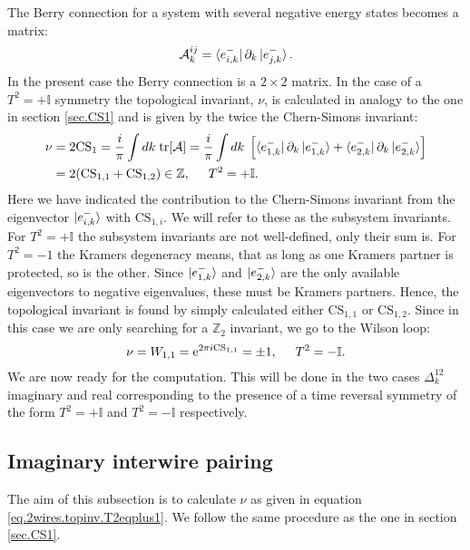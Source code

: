 The Berry connection for a system with several negative energy states becomes a matrix:
\begin{equation}
\mathcal{A}^{ij}_k = \bra{e^{-}_{i,k}}\partial_k\ket{e^{-}_{j,k}}.
\end{equation}
In the present case the Berry connection is a $2\times 2$ matrix. In the case of a $T^2 = + \mathbb{I}$ symmetry the topological invariant, $\nu$, is calculated in analogy to the one in section \ref{sec.CS1} and is given by the twice the Chern-Simons invariant:
\begin{align}
\nu &= 2\text{CS}_1 = \frac{i}{\pi} \int dk\; \text{tr}[\mathcal{A}] = \frac{i}{\pi} \int dk\; \left[\bra{e^{-}_{1,k}}\partial_k\ket{e^{-}_{1,k}} + \bra{e^{-}_{2,k}}\partial_k\ket{e^{-}_{2,k}}  \right] \nonumber \\
 &= 2(\text{CS}_{1,1} + \text{CS}_{1,2})\in \mathbb{Z}, \hspace{0.5cm} T^2 = +\mathbb{I}.
\label{eq.2wires.topinv.T2eqplus1}
\end{align}
Here we have indicated the contribution to the Chern-Simons invariant from the eigenvector $\ket{e^{-}_{i,k}}$ with $\text{CS}_{1,i}$. We will refer to these as the subsystem invariants. For $T^2 = +\mathbb{I}$ the subsystem invariants are not well-defined, only their sum is. For $T^2 = -1$ the Kramers degeneracy means, that as long as one Kramers partner is protected, so is the other. Since $\ket{e^{-}_{1,k}}$ and $\ket{e^{-}_{2,k}}$ are the only available eigenvectors to negative eigenvalues, these must be Kramers partners. Hence, the topological invariant is found by simply calculated either $\text{CS}_{1,1}$ or $\text{CS}_{1,2}$\cite{FuKane2006, LiYangChen}. Since in this case we are only searching for a $\mathbb{Z}_2$ invariant, we go to the Wilson loop:
\begin{equation}
\nu = W_{1,1} = \text{e}^{2\pi i\text{CS}_{1,1}} = \pm 1, \hspace{0.5cm} T^2 = -\mathbb{I}.
\label{eq.2wires.topinv.T2eqminus1}
\end{equation}
We are now ready for the computation. This will be done in the two cases $\Delta^{12}_k$ imaginary and real corresponding to the presence of a time reversal symmetry of the form $T^2 = +\mathbb{I}$ and $T^2 = -\mathbb{I}$ respectively. 

\subsection{Imaginary interwire pairing}
\label{subsec.2wires_CSinv_Delta12imag}
The aim of this subsection is to calculate $\nu$ as given in equation \eqref{eq.2wires.topinv.T2eqplus1}. We follow the same procedure as the one in section \ref{sec.CS1}. 

